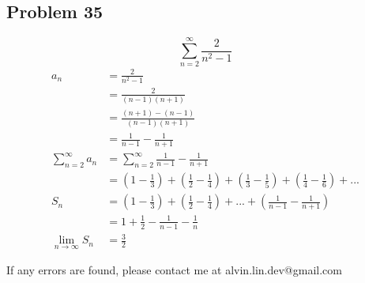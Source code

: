 \documentclass[letterpaper, 12pt]{math}
\begin{document}
\subsection*{Problem 35}
\[ \sum_{n=2}^{\infty}\frac{2}{n^{2}-1} \]
\begin{align*}
  a_{n} &= \frac{2}{n^{2}-1} \\
  &= \frac{2}{(n-1)(n+1)} \\
  &= \frac{(n+1)-(n-1)}{(n-1)(n+1)} \\
  &= \frac{1}{n-1}-\frac{1}{n+1} \\
  \sum_{n=2}^{\infty}a_{n} &= \sum_{n=2}^{\infty}\frac{1}{n-1}-\frac{1}{n+1} \\
  &= (1-\frac{1}{3})+(\frac{1}{2}-\frac{1}{4})+(\frac{1}{3}-\frac{1}{5})+
    (\frac{1}{4}-\frac{1}{6})+... \\
  S_{n} &= (1-\frac{1}{3})+(\frac{1}{2}-\frac{1}{4})+...+
    (\frac{1}{n-1}-\frac{1}{n+1}) \\
  &= 1+\frac{1}{2}-\frac{1}{n-1}-\frac{1}{n} \\
  \lim_{n\to\infty}S_{n} &= \frac{3}{2}
\end{align*}

\begin{center}
  If any errors are found, please contact me at alvin.lin.dev@gmail.com
\end{center}
\end{document}
